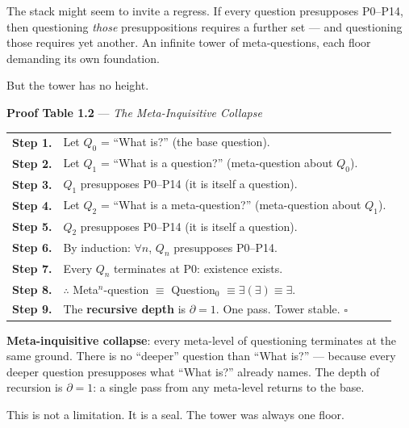 \documentclass[10pt, openany, oneside]{book}
\begin{document}
The stack might seem to invite a regress. If every question presupposes P0--P14, then questioning \textit{those} presuppositions requires a further set --- and questioning those requires yet another. An infinite tower of meta-questions, each floor demanding its own foundation.

But the tower has no height.

\textbf{Proof Table 1.2} --- \textit{The Meta-Inquisitive Collapse}

\vspace{0.5em}

\noindent\begin{tabular}{r p{}}
\textbf{Step 1.} & Let $Q_0$ = ``What is?'' (the base question). \\[0.3em]
\textbf{Step 2.} & Let $Q_1$ = ``What is a question?'' (meta-question about $Q_0$). \\[0.3em]
\textbf{Step 3.} & $Q_1$ presupposes P0--P14 (it is itself a question). \\[0.3em]
\textbf{Step 4.} & Let $Q_2$ = ``What is a meta-question?'' (meta-question about $Q_1$). \\[0.3em]
\textbf{Step 5.} & $Q_2$ presupposes P0--P14 (it is itself a question). \\[0.3em]
\textbf{Step 6.} & By induction: $\forall n$, $Q_n$ presupposes P0--P14. \\[0.3em]
\textbf{Step 7.} & Every $Q_n$ terminates at P0: existence exists. \\[0.3em]
\textbf{Step 8.} & $\therefore$ Meta$^n$-question $\equiv$ Question$_0$ $\equiv \exists(\exists) \equiv \exists$. \\[0.3em]
\textbf{Step 9.} & The \textbf{recursive depth} is $\partial = 1$. One pass. Tower stable. $\square$ \\[0.3em]
\end{tabular}

\vspace{0.8em}

\noindent \textbf{Meta-inquisitive collapse}: every meta-level of questioning terminates at the same ground. There is no ``deeper'' question than ``What is?'' --- because every deeper question presupposes what ``What is?'' already names. The depth of recursion is $\partial = 1$: a single pass from any meta-level returns to the base.

This is not a limitation. It is a seal. The tower was always one floor.

\vspace{1.5em}
\end{document}
